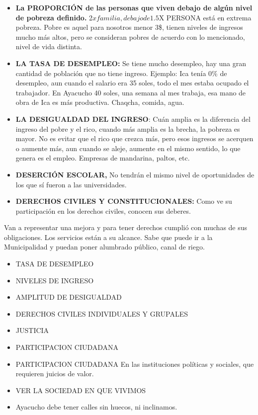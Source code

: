 \documentclass[
  letterpaper,
  DIV=11,
  numbers=noendperiod]{scrartcl}
\begin{document}
\begin{itemize}
\item
  \textbf{La PROPORCIÓN de las personas que viven debajo de algún nivel
  de pobreza definido.} 2\(x familia, debajo de 1.5\)X PERSONA está en
  extrema pobreza. Pobre es aquel para nosotros menor 3\$, tienen
  niveles de ingresos mucho más altos, pero se consideran pobres de
  acuerdo con lo mencionado, nivel de vida distinta.
\item
  \textbf{LA TASA DE DESEMPLEO:} Se tiene mucho desempleo, hay una gran
  cantidad de población que no tiene ingreso. Ejemplo: Ica tenía 0\% de
  desempleo, aun cuando el salario era 35 soles, todo el mes estaba
  ocupado el trabajador. En Ayacucho 40 soles, una semana al mes
  trabaja, esa mano de obra de Ica es más productiva. Chaqcha, comida,
  agua.
\item
  \textbf{LA DESIGUALDAD DEL INGRESO}: Cuán amplia es la diferencia del
  ingreso del pobre y el rico, cuando más amplia es la brecha, la
  pobreza es mayor. No es evitar que el rico que crezca más, pero esos
  ingresos se acerquen o aumente más, aun cuando se aleje, aumente en el
  mismo sentido, lo que genera es el empleo. Empresas de mandarina,
  paltos, etc.
\item
  \textbf{DESERCIÓN ESCOLAR,} No tendrán el mismo nivel de oportunidades
  de los que sí fueron a las universidades.
\item
  \textbf{DERECHOS CIVILES Y CONSTITUCIONALES:} Como ve su participación
  en los derechos civiles, conocen sus deberes.
\end{itemize}

Van a representar una mejora y para tener derechos cumplió con muchas de
sus obligaciones. Los servicios están a su alcance. Sabe que puede ir a
la Municipalidad y puedan poner alumbrado público, canal de riego.

\begin{itemize}
\item
  TASA DE DESEMPLEO
\item
  NIVELES DE INGRESO
\item
  AMPLITUD DE DESIGUALDAD
\item
  DERECHOS CIVILES INDIVIDUALES Y GRUPALES
\item
  JUSTICIA
\item
  PARTICIPACION CIUDADANA
\item
  PARTICIPACION CIUDADANA En las instituciones políticas y sociales, que
  requieren juicios de valor.
\item
  VER LA SOCIEDAD EN QUE VIVIMOS
\item
  Ayacucho debe tener calles sin huecos, ni inclinamos.
\end{itemize}
\end{document}
